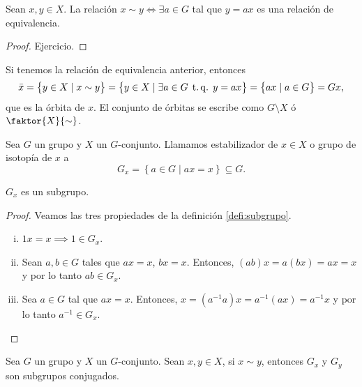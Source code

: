 \begin{prop}
    Sean $x, y \in X$. La relación $x \sim y \iff \exists a \in G$ tal que $y = ax$ es una relación de equivalencia.
\end{prop}

\begin{proof}
 Ejercicio.
\end{proof}

\begin{obs}
    Si tenemos la relación de equivalencia anterior, entonces
    \[
        \bar{x} = \left\{ y \in X \mid x \sim y \right\} = \left\{ y \in X \mid \exists a \in G \operatorname{\;t.q.\;} y = ax \right\}
    = \left\{ ax \mid a \in G \right\} = Gx,
    \]
    que es la órbita de $x$. El conjunto de órbitas se escribe como
    $G \setminus X$ ó $\faktor{X}{\sim}$.
\end{obs}

\begin{defi}
    Sea $G$ un grupo y $X$ un $G$-conjunto. Llamamos estabilizador de $x \in X$ o grupo de isotopía de $x$ a
    \[
        G_x = \left\{ a \in G \mid ax = x \right\} \subseteq G.
    \]
\end{defi}

\begin{prop}
    $G_x$ es un subgrupo.
\end{prop}

\begin{proof}
    Veamos las tres propiedades de la definición \ref{defi:subgrupo}.
    \begin{enumerate}[i)]
        \item $1x = x \implies 1\in G_x$.
        \item Sean $a, b \in G$ tales que $ax = x$, $bx = x$. Entonces, $(ab)x = a(bx) = ax = x$ y por lo tanto $ab \in G_x$.
        \item Sea $a \in G$ tal que $ax = x$. Entonces, $x = (a^{-1}a)x = a^{-1}(ax) = a^{-1}x$ y por lo tanto $a^{-1} \in G_x$.
    \end{enumerate}
\end{proof}

\begin{lema}
    Sea $G$ un grupo y $X$ un $G$-conjunto. Sean $x, y \in X$, si $x \sim y$, entonces $G_x$ y $G_y$ son
    subgrupos conjugados.
\end{lema}


